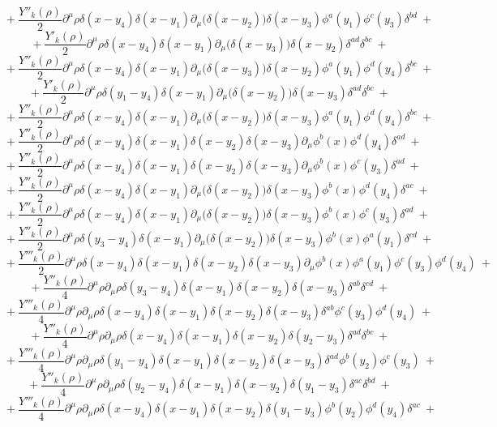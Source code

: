 $$+\ \frac{Y''_k(\rho)}{2}\partial^\mu\rho\delta(x - y_4)\delta(x - y_1)\partial_\mu\big(\delta(x - y_2)\big) \delta(x - y_3)\phi^a(y_1)\phi^c(y_3)\delta^{bd} \ +$$
$$+\ \frac{Y'_k(\rho)}{2}\partial^\mu\rho\delta(x - y_4)\delta(x - y_1)\partial_\mu\big(\delta(x - y_3)\big) \delta(x - y_2)\delta^{ad}\delta^{bc} \ +$$
$$+\ \frac{Y''_k(\rho)}{2}\partial^\mu\rho\delta(x - y_4)\delta(x - y_1)\partial_\mu\big(\delta(x - y_3)\big) \delta(x - y_2)\phi^a(y_1)\phi^d(y_4)\delta^{bc} \ +$$
$$+\ \frac{Y'_k(\rho)}{2}\partial^\mu\rho\delta(y_1 - y_4)\delta(x - y_1)\partial_\mu\big(\delta(x - y_2)\big) \delta(x - y_3)\delta^{ad}\delta^{bc} \ +$$
$$+\ \frac{Y''_k(\rho)}{2}\partial^\mu\rho\delta(x - y_4)\delta(x - y_1)\partial_\mu\big(\delta(x - y_2)\big) \delta(x - y_3)\phi^a(y_1)\phi^d(y_4)\delta^{bc} \ +$$
$$+\ \frac{Y''_k(\rho)}{2}\partial^\mu\rho\delta(x - y_4)\delta(x - y_1)\delta(x - y_2) \delta(x - y_3)\partial_\mu\phi^b(x)\phi^d(y_4)\delta^{ad} \ +$$
$$+\ \frac{Y''_k(\rho)}{2}\partial^\mu\rho\delta(x - y_4)\delta(x - y_1)\delta(x - y_2) \delta(x - y_3)\partial_\mu\phi^b(x)\phi^c(y_3)\delta^{ad} \ +$$
$$+\ \frac{Y''_k(\rho)}{2}\partial^\mu\rho\delta(x - y_4)\delta(x - y_1)\partial_\mu\big(\delta(x - y_2)\big) \delta(x - y_3)\phi^b(x)\phi^d(y_4)\delta^{ac} \ +$$
$$+\ \frac{Y''_k(\rho)}{2}\partial^\mu\rho\delta(x - y_4)\delta(x - y_1)\partial_\mu\big(\delta(x - y_2)\big) \delta(x - y_3)\phi^b(x)\phi^c(y_3)\delta^{ad} \ +$$
$$+\ \frac{Y''_k(\rho)}{2}\partial^\mu\rho\delta(y_3 - y_4)\delta(x - y_1)\partial_\mu\big(\delta(x - y_2)\big) \delta(x - y_3)\phi^b(x)\phi^a(y_1)\delta^{cd} \ +$$
$$+\ \frac{Y'''_k(\rho)}{2}\partial^\mu\rho\delta(x - y_4)\delta(x - y_1)\delta(x - y_2)\delta(x - y_3)\partial_\mu\phi^b(x)\phi^a(y_1)\phi^c(y_3)\phi^d(y_4) \ +$$
$$+\ \frac{Y''_k(\rho)}{4}\partial^\mu\rho\partial_\mu\rho\delta(y_3 - y_4)\delta(x - y_1)\delta(x - y_2)\delta(x - y_3)\delta^{ab}\delta^{cd} \ +$$
$$+\ \frac{Y'''_k(\rho)}{4}\partial^\mu\rho\partial_\mu\rho\delta(x - y_4)\delta(x - y_1)\delta(x - y_2)\delta(x - y_3)\delta^{ab}\phi^c(y_3)\phi^d(y_4) \ +$$
$$+\ \frac{Y''_k(\rho)}{4}\partial^\mu\rho\partial_\mu\rho\delta(x - y_4)\delta(x - y_1)\delta(x - y_2)\delta(y_2 - y_3)\delta^{ad}\delta^{bc} \ +$$
$$+\ \frac{Y'''_k(\rho)}{4}\partial^\mu\rho\partial_\mu\rho\delta(y_1 - y_4)\delta(x - y_1)\delta(x - y_2)\delta(x - y_3)\delta^{ad}\phi^b(y_2)\phi^c(y_3) \ +$$
$$+\ \frac{Y''_k(\rho)}{4}\partial^\mu\rho\partial_\mu\rho\delta(y_2 - y_4)\delta(x - y_1)\delta(x - y_2)\delta(y_1 - y_3)\delta^{ac}\delta^{bd} \ +$$
$$+\ \frac{Y'''_k(\rho)}{4}\partial^\mu\rho\partial_\mu\rho\delta(x - y_4)\delta(x - y_1)\delta(x - y_2)\delta(y_1 - y_3)\phi^b(y_2)\phi^d(y_4)\delta^{ac} \ +$$
